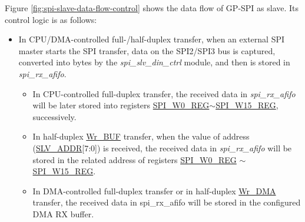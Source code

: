 \documentclass[main\_\_EN.tex]{subfiles}
\begin{document}
Figure \ref{fig:spi-slave-data-flow-control} shows the data flow of GP-SPI as slave. Its control logic is as follows:
\begin{itemize}
    \item In CPU/DMA-controlled full-/half-duplex transfer, when an external SPI master starts the SPI transfer, data on the SPI2/SPI3 bus is captured, converted into bytes by the \textit{spi\_slv\_din\_ctrl} module, and then is stored in \textit{spi\_rx\_afifo}.
    \begin{itemize}
        \item In CPU-controlled full-duplex transfer, the received data in \textit{spi\_rx\_afifo} will be later stored into registers \hyperref[regdesc:SPIW0REG]{SPI\_W0\_REG}$\sim$\hyperref[regdesc:SPIW15REG]{SPI\_W15\_REG}, successively.
        \item In half-duplex \hyperref[cmd:wrbuf]{Wr\_BUF} transfer, when the value of address (\hyperref[regdesc:SPIW0REG]{SLV\_ADDR}[7:0]) is received, the received data in \textit{spi\_rx\_afifo} will be stored in the related address of registers \hyperref[regdesc:SPIW0REG]{SPI\_W0\_REG} $\sim$\hyperref[regdesc:SPIW15REG]{SPI\_W15\_REG}.
        \item In DMA-controlled full-duplex transfer or in half-duplex \hyperref[cmd:wrdma]{Wr\_DMA} transfer, the received data in spi\_rx\_afifo will be stored in the configured DMA RX buffer.


\end{itemize}
\end{itemize}
\end{document}

